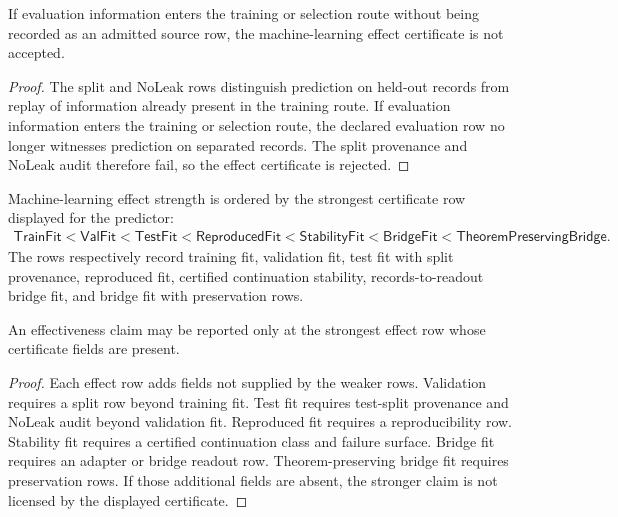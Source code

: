\begin{theorem}
\label{thm:philosophy-leakage-breaks-effect-certification}
If evaluation information enters the training or selection route without
being recorded as an admitted source row, the machine-learning effect
certificate is not accepted.
\end{theorem}
\begin{proof}
The split and NoLeak rows distinguish prediction on held-out records
from replay of information already present in the training route. If
evaluation information enters the training or selection route, the
declared evaluation row no longer witnesses prediction on separated
records. The split provenance and NoLeak audit therefore fail, so the
effect certificate is rejected.
\end{proof}

\begin{definition}
\label{def:philosophy-machine-learning-effect-strength}
Machine-learning effect strength is ordered by the strongest certificate
row displayed for the predictor:
$$
\begin{gathered}
\mathsf{TrainFit}
<
\mathsf{ValFit}
<
\mathsf{TestFit}
<
\mathsf{ReproducedFit}
<
\mathsf{StabilityFit}
<
\mathsf{BridgeFit}
<
\mathsf{TheoremPreservingBridge}.
\end{gathered}
$$
The rows respectively record training fit, validation fit, test fit with
split provenance, reproduced fit, certified continuation stability,
records-to-readout bridge fit, and bridge fit with preservation rows.
\end{definition}

\begin{theorem}
\label{thm:philosophy-effect-strength-certificate-strength}
An effectiveness claim may be reported only at the strongest effect row
whose certificate fields are present.
\end{theorem}
\begin{proof}
Each effect row adds fields not supplied by the weaker rows. Validation
requires a split row beyond training fit. Test fit requires test-split
provenance and NoLeak audit beyond validation fit. Reproduced fit
requires a reproducibility row. Stability fit requires a certified
continuation class and failure surface. Bridge fit requires an adapter
or bridge readout row. Theorem-preserving bridge fit requires
preservation rows. If those additional fields are absent, the stronger
claim is not licensed by the displayed certificate.
\end{proof}

